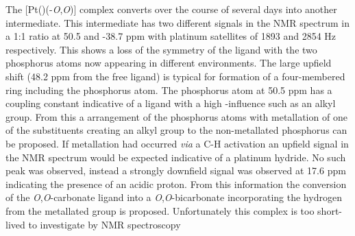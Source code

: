 The [Pt(\tButhixantphos)(-\emph{O},\emph{O})] complex converts over the course of several days into another intermediate.  This intermediate has two different signals in the \phosphorus{} NMR spectrum  in a 1:1 ratio at 50.5 and -38.7 ppm with platinum satellites of 1893 and 2854 Hz respectively.  This shows a loss of the symmetry of the \tButhixantphos{} ligand with the two phosphorus atoms now appearing in different environments.  The large upfield shift (48.2 ppm from the free ligand) is typical  for formation of a four-membered ring including the phosphorus atom.\cite{Garrou1981}  The phosphorus atom at 50.5 ppm has a coupling constant indicative of a \trans{} ligand with a high \trans{}-influence such as an alkyl group.  From this a \cis{} arrangement of the phosphorus atoms with metallation of one of the \tBu{} substituents creating an alkyl group \trans{} to the non-metallated phosphorus can be proposed.  If metallation had occurred \emph{via} a C-H activation an upfield signal in the \proton{} NMR spectrum would be expected indicative of a platinum hydride.  No such peak was observed, instead a strongly downfield \proton{} signal was observed at 17.6 ppm indicating the presence of an acidic proton.  From this information the conversion of the \emph{O},\emph{O}-carbonate ligand into a \emph{O},\emph{O}-bicarbonate incorporating the hydrogen from the metallated \tBu{} group is proposed.  Unfortunately this complex is too short-lived to investigate by \carbon{} NMR spectroscopy

